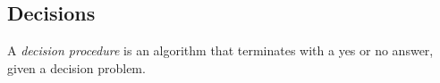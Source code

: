 










\subsection{Decisions}


A \textit{decision procedure} is an algorithm that terminates with a yes or no answer, given a decision problem.\cite{decisionproceduresbook} 








